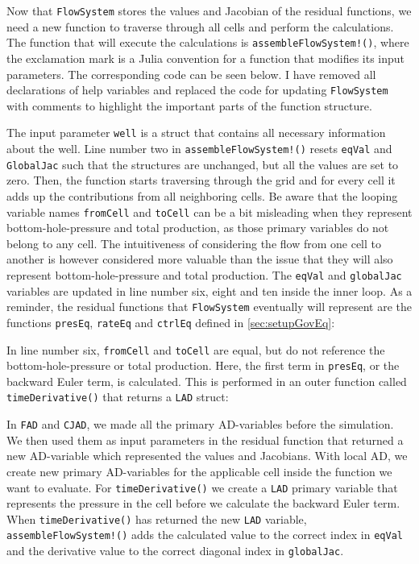 Now that \texttt{FlowSystem} stores the  values and Jacobian of the residual functions, we need a new function to traverse through all cells and perform the calculations. The function that will execute the calculations is \texttt{assembleFlowSystem!()}, where the exclamation mark is a Julia convention for a function that modifies its input parameters. The corresponding code can be seen below. I have removed all declarations of help variables and replaced the code for updating \texttt{FlowSystem} with comments to highlight the important parts of the function structure.
\lstset{numbers=left}

\lstset{numbers=none}
The input parameter \texttt{well} is a struct that contains all necessary information about the well. Line number two in \texttt{assembleFlowSystem!()} resets \texttt{eqVal} and \texttt{GlobalJac} such that the structures are unchanged, but all the values are set to zero. Then, the function starts traversing through the grid and for every cell it adds up the contributions from all neighboring cells. Be aware that the looping variable names \texttt{fromCell} and \texttt{toCell} can be a bit misleading when they represent bottom-hole-pressure and total production, as those primary variables do not belong to any cell. The intuitiveness of considering the flow from one cell to another is however considered more valuable than the issue that they will also represent bottom-hole-pressure and total production. The \texttt{eqVal} and \texttt{globalJac} variables are updated in line number six, eight and ten inside the inner loop. As a reminder, the residual functions that \texttt{FlowSystem} eventually will represent are the functions \texttt{presEq}, \texttt{rateEq} and \texttt{ctrlEq} defined in \autoref{sec:setupGovEq}:

In line number six, \texttt{fromCell} and \texttt{toCell} are equal, but do not reference the bottom-hole-pressure or total production. Here, the first term in \texttt{presEq}, or the backward Euler term, is calculated. This is performed in an outer function called \texttt{timeDerivative()} that returns a \texttt{LAD} struct:

In \texttt{FAD} and \texttt{CJAD}, we made all the primary AD-variables before the simulation. We then used them as input parameters in the residual function that returned a new AD-variable which represented the values and Jacobians. With local AD, we create new primary AD-variables for the applicable cell inside the function we want to evaluate. For \texttt{timeDerivative()} we create a \texttt{LAD} primary variable that represents the pressure in the cell before we calculate the backward Euler term. When \texttt{timeDerivative()} has returned the new \texttt{LAD} variable, \texttt{assembleFlowSystem!()} adds the calculated value to the correct index in \texttt{eqVal} and the derivative value to the correct diagonal index in \texttt{globalJac}.

